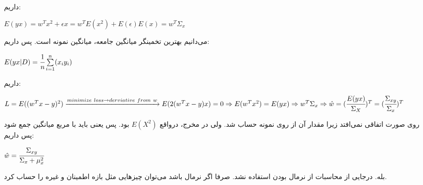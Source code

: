 \documentclass[a4paper,14pt]{extarticle}
\begin{document}
داریم:
\begin{latin}
	$
	E(yx) = w^T x^2 + \epsilon x = w^T E(x^2) + E(\epsilon) E(x) = w^T \Sigma_x
	$
\end{latin}
می‌دانیم بهترین تخمینگر میانگین جامعه، میانگین نمونه است. پس داریم:
\begin{latin}
	$
	E(yx | D) = \cfrac{1}{n} \sum\limits_{i = 1}^n (x_i y_i)
	$
\end{latin}
داریم:
\begin{latin}
	$
	L = E((w^T x  - y)^2) \xrightarrow{minimize\ loss \rightarrow derviative\ from\ w} E(2(w^Tx - y)x) = 0 \Rightarrow E(w^Tx^2) = E(yx)
	\Rightarrow w^T \Sigma_x \Rightarrow \hat{w} = (\cfrac{E(yx)}{\Sigma_X})^T = (\cfrac{\Sigma_{xy}}{\Sigma_x})^T
	$
\end{latin}
روی صورت اتفاقی نمی‌افتد زیرا مقدار آن از روی نمونه حساب شد. ولی در مخرج، درواقع 
$
E(X^2)
$
بود. پس یعنی باید با مربع میانگین جمع شود پس داریم:
\begin{latin}
	$
	\hat{w} = \cfrac{\Sigma_{xy}}{\Sigma_x + \mu_x^2}
	$
\end{latin}


بله. درجایی از محاسبات از نرمال بودن استفاده نشد. صرفا اگر نرمال باشد می‌توان چیزهایی مثل بازه اطمینان و غیره را حساب کرد.
	
\end{document}
